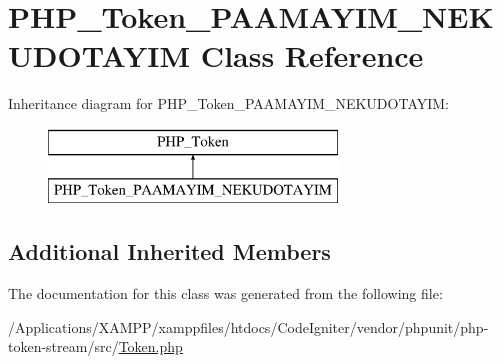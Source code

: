 \hypertarget{class_p_h_p___token___p_a_a_m_a_y_i_m___n_e_k_u_d_o_t_a_y_i_m}{}\section{P\+H\+P\+\_\+\+Token\+\_\+\+P\+A\+A\+M\+A\+Y\+I\+M\+\_\+\+N\+E\+K\+U\+D\+O\+T\+A\+Y\+IM Class Reference}
\label{class_p_h_p___token___p_a_a_m_a_y_i_m___n_e_k_u_d_o_t_a_y_i_m}
Inheritance diagram for P\+H\+P\+\_\+\+Token\+\_\+\+P\+A\+A\+M\+A\+Y\+I\+M\+\_\+\+N\+E\+K\+U\+D\+O\+T\+A\+Y\+IM\+:\begin{figure}[H]
\begin{center}
\leavevmode
\includegraphics[height=2.000000cm]{class_p_h_p___token___p_a_a_m_a_y_i_m___n_e_k_u_d_o_t_a_y_i_m}
\end{center}
\end{figure}
\subsection*{Additional Inherited Members}


The documentation for this class was generated from the following file\+:\begin{DoxyCompactItemize}
\item 
/\+Applications/\+X\+A\+M\+P\+P/xamppfiles/htdocs/\+Code\+Igniter/vendor/phpunit/php-\/token-\/stream/src/\mbox{\hyperlink{_token_8php}{Token.\+php}}\end{DoxyCompactItemize}
